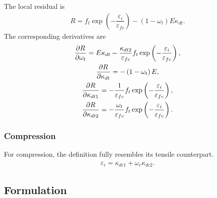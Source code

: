 The local residual is
\begin{gather}
R=f_t\exp\left(-\dfrac{\varepsilon_i}{\varepsilon_{fc}}\right)-\left(1-\omega_t\right)E\kappa_{dt}.
\end{gather}
The corresponding derivatives are
\begin{gather}
\dfrac{\partial{R}}{\partial{\omega_t}}=E\kappa_{dt}-\dfrac{\kappa_{dt2}}{\varepsilon_{fc}}f_t\exp\left(-\dfrac{\varepsilon_i}{\varepsilon_{fc}}\right),\\
\dfrac{\partial{R}}{\partial{\kappa_{dt}}}=-\left(1-\omega_t\right)E,\\
\dfrac{\partial{R}}{\partial{\kappa_{dt1}}}=-\dfrac{1}{\varepsilon_{fc}}f_t\exp\left(-\dfrac{\varepsilon_i}{\varepsilon_{fc}}\right),\\
\dfrac{\partial{R}}{\partial{\kappa_{dt2}}}=-\dfrac{\omega_t}{\varepsilon_{fc}}f_t\exp\left(-\dfrac{\varepsilon_i}{\varepsilon_{fc}}\right).
\end{gather}
\subsubsection{Compression}
For compression, the definition fully resembles its tensile counterpart.
\begin{gather}
\varepsilon_i=\kappa_{dc1}+\omega_c\kappa_{dc2}.
\end{gather}
\subsection{Formulation}
